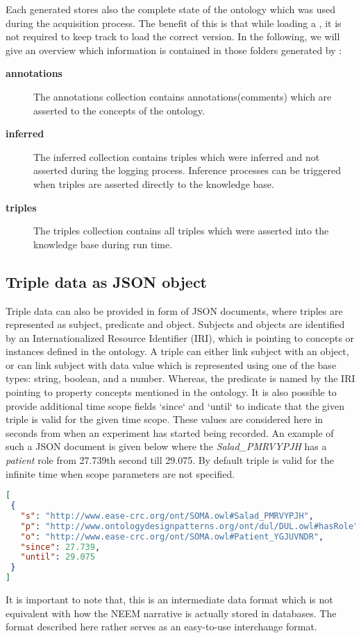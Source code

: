 Each generated \neem stores also the complete state of the \soma ontology which was used during the acquisition process.
The benefit of this is that while loading a \neem, it is not required to keep track to load the correct \soma version.
In the following, we will give an overview which information is contained in those folders generated by \knowrob:


\begin{description}
	\item[\textbf{annotations}] The annotations collection contains annotations(comments) which are asserted to the concepts of the ontology.
	\item[\textbf{inferred}] The inferred collection contains triples which were inferred and not asserted during the logging process. Inference processes can be triggered when triples are asserted directly to the knowledge base.
	\item[\textbf{triples}] The triples collection contains all triples which were asserted into the knowledge base during run time.
\end{description}

\subsection{Triple data as JSON object}
	Triple data can also be provided in form of JSON documents, where triples are represented as subject, predicate and object. Subjects and objects are identified by an Internationalized Resource Identifier (IRI), which is pointing to concepts or instances defined in the \soma ontology. A triple can either link subject with an object, or can link subject with data value which is represented using one of the base types: string, boolean, and a number. Whereas, the predicate is named by the IRI pointing to property concepts mentioned in the \soma ontology. It is also possible to provide additional time scope fields `since` and `until` to indicate that the given triple is valid for the given time scope. These values are considered here in seconds from when an experiment has started being recorded. An example of such a JSON document is given below where the \emph{Salad\_PMRVYPJH} has a \emph{patient} role from 27.739th second till 29.075. By default triple is valid for the infinite time when scope parameters are not specified. 
\begin{lstlisting}[language=json,firstnumber=1]
[
 {
   "s": "http://www.ease-crc.org/ont/SOMA.owl#Salad_PMRVYPJH",
   "p": "http://www.ontologydesignpatterns.org/ont/dul/DUL.owl#hasRole",
   "o": "http://www.ease-crc.org/ont/SOMA.owl#Patient_YGJUVNDR",
   "since": 27.739,
   "until": 29.075
 }
]
\end{lstlisting}

It is important to note that, this is an intermediate data format which is not equivalent with how the NEEM narrative is actually stored in databases.
The format described here rather serves as an easy-to-use interchange format.



